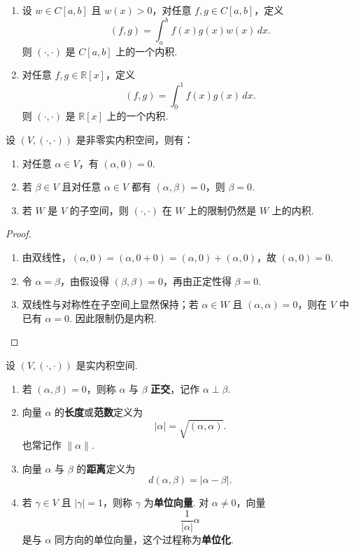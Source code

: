 \begin{example}
	\begin{enumerate}
		\item 设 $w\in C[a,b]$ 且 $w(x)>0$，对任意 $f,g\in C[a,b]$，定义
		\[
		(f,g)=\int_a^b f(x)g(x)w(x)\,dx.
		\]
		则 $(\cdot,\cdot)$ 是 $C[a,b]$ 上的一个内积.
		\item 对任意 $f,g\in\mathbb{R}[x]$，定义
		\[
		(f,g)=\int_0^1 f(x)g(x)\,dx.
		\]
		则 $(\cdot,\cdot)$ 是 $\mathbb{R}[x]$ 上的一个内积.
	\end{enumerate}
	
\end{example}


\begin{lemma}
	设 $(V,(\cdot,\cdot))$ 是非零实内积空间，则有：
	\begin{enumerate}
		\item 对任意 $\alpha\in V$，有 $(\alpha,0)=0$.
		\item 若 $\beta\in V$ 且对任意 $\alpha\in V$ 都有 $(\alpha,\beta)=0$，则 $\beta=0$.
		\item 若 $W$ 是 $V$ 的子空间，则 $(\cdot,\cdot)$ 在 $W$ 上的限制仍然是 $W$ 上的内积.
	\end{enumerate}
\end{lemma}
\begin{proof}
	\begin{enumerate}
		\item 由双线性，$(\alpha,0)=(\alpha,0+0)=(\alpha,0)+(\alpha,0)$，故 $(\alpha,0)=0$.
		\item 令 $\alpha=\beta$，由假设得 $(\beta,\beta)=0$，再由正定性得 $\beta=0$.
		\item 双线性与对称性在子空间上显然保持；若 $\alpha\in W$ 且 $(\alpha,\alpha)=0$，则在 $V$ 中已有 $\alpha=0$. 因此限制仍是内积.
	\end{enumerate}
\end{proof}



\begin{definition}
	设 $(V,(\cdot,\cdot))$ 是实内积空间.
	\begin{enumerate}
		\item 若 $(\alpha,\beta)=0$，则称 $\alpha$ 与 $\beta$ \textbf{正交}，记作 $\alpha\perp\beta$.
		\item 向量 $\alpha$ 的\textbf{长度}或\textbf{范数}定义为
		\[
		|\alpha|=\sqrt{(\alpha,\alpha)}.
		\]
		也常记作 $\|\alpha\|$.
		\item 向量 $\alpha$ 与 $\beta$ 的\textbf{距离}定义为
		\[
		d(\alpha,\beta)=|\alpha-\beta|.
		\]
		\item 若 $\gamma\in V$ 且 $|\gamma|=1$，则称 $\gamma$ 为\textbf{单位向量}. 对 $\alpha\ne0$，向量
		\[
		\frac{1}{|\alpha|}\alpha
		\]
		是与 $\alpha$ 同方向的单位向量，这个过程称为\textbf{单位化}.
	\end{enumerate}
\end{definition}

